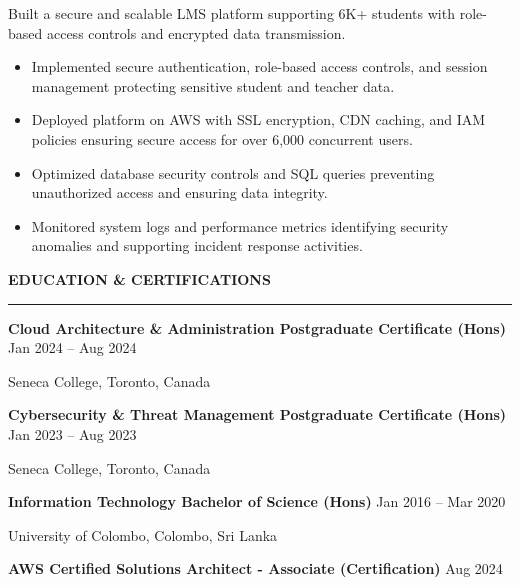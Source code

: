 \documentclass[10pt,letterpaper]{article}
\begin{document}
\vspace{-1pt}

Built a secure and scalable LMS platform supporting 6K+ students with role-based access controls and encrypted data transmission.
\vspace{-1pt}
\begin{itemize}
\item Implemented secure authentication, role-based access controls, and session management protecting sensitive student and teacher data.
\item Deployed platform on AWS with SSL encryption, CDN caching, and IAM policies ensuring secure access for over 6,000 concurrent users.
\item Optimized database security controls and SQL queries preventing unauthorized access and ensuring data integrity.
\item Monitored system logs and performance metrics identifying security anomalies and supporting incident response activities.
\end{itemize}

\vspace{6pt}

\textbf{EDUCATION \& CERTIFICATIONS}\\[-8pt]
\noindent\rule{\textwidth}{1pt}

\vspace{-2pt}

\textbf{Cloud Architecture \& Administration Postgraduate Certificate (Hons)} \hfill Jan 2024 -- Aug 2024

Seneca College, Toronto, Canada

\textbf{Cybersecurity \& Threat Management Postgraduate Certificate (Hons)} \hfill Jan 2023 -- Aug 2023

Seneca College, Toronto, Canada

\textbf{Information Technology Bachelor of Science (Hons)} \hfill Jan 2016 -- Mar 2020

University of Colombo, Colombo, Sri Lanka

\textbf{AWS Certified Solutions Architect - Associate (Certification)} \hfill Aug 2024
\end{document}
